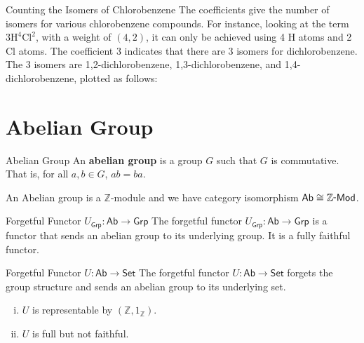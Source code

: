 \begin{example}{Counting the Isomers of Chlorobenzene}{}
    The coefficients give the number of isomers for various chlorobenzene compounds. For instance, looking at the term \(3 \text{H}^4 \text{Cl}^2\), with a weight of $(4,2)$, it can only be achieved using 4 H atoms and 2 Cl atoms. The coefficient 3 indicates that there are 3 isomers for dichlorobenzene. The 3 isomers are 1,2-dichlorobenzene, 1,3-dichlorobenzene, and 1,4-dichlorobenzene, plotted as follows:

    \begin{center}
         \qquad %
         \qquad %
    \end{center}
\end{example}



\section{Abelian Group}
\begin{definition}{Abelian Group}{}
    An \textbf{abelian group} is a group $G$ such that $G$ is commutative. That is, for all $a,b\in G$, $ab=ba$.
\end{definition}


An Abelian group is a $\mathbb{Z}$-module and we have category isomorphism $\mathsf{Ab}\cong\mathbb{Z}\raisebox{0.22ex}{-}\mathsf{Mod}$.

\begin{example}{Forgetful Functor $U_{\mathsf{Grp}}: \mathsf{Ab}\to \mathsf{Grp}$}{}
    The forgetful functor $U_{\mathsf{Grp}}: \mathsf{Ab}\to \mathsf{Grp}$ is a functor that sends an abelian group to its underlying group. It is a fully faithful functor.
\end{example}


\begin{example}{Forgetful Functor $U: \mathsf{Ab}\to \mathsf{Set}$}{}
    The forgetful functor $U: \mathsf{Ab}\to \mathsf{Set}$ forgets the group structure and sends an abelian group to its underlying set.
    \begin{enumerate}[(i)]
        \item $U$ is representable by $\left(\mathbb{Z}, 1_\mathbb{Z}\right)$.
        \item $U$ is full but not faithful.
    \end{enumerate}
\end{example}


